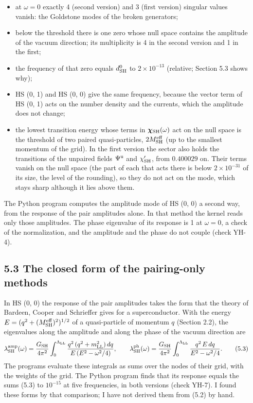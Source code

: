 \documentclass[
  10pt,
]{article}
\providecommand{\tightlist}{%
  \setlength{\itemsep}{0pt}\setlength{\parskip}{0pt}}
\begin{document}
\begin{itemize}
\tightlist
\item
  at \(\omega=0\) exactly 4 (second version) and 3 (first version)
  singular values vanish: the Goldstone modes of the broken generators;
\item
  below the threshold there is one zero whose null space contains the
  amplitude of the vacuum direction; its multiplicity is 4 in the second
  version and 1 in the first;
\item
  the frequency of that zero equals \(d^0_{\rm SH}\) to
  \(2\times10^{-13}\) (relative; Section 5.3 shows why);
\item
  HS (0, 1) and HS (0, 0) give the same frequency, because the vector
  term of HS (0, 1) acts on the number density and the currents, which
  the amplitude does not change;
\item
  the lowest transition energy whose terms in
  \(\boldsymbol\chi_{\rm SH}(\omega)\) act on the null space is the
  threshold of two paired quasi-particles, \(2M^{\rm eff}_{\rm SH}\) (up
  to the smallest momentum of the grid). In the first version the sector
  also holds the transitions of the unpaired fields \(\Psi^{\rm u}\) and
  \(\chi'_{\rm SH}\), from \(0.400029\) on. Their terms vanish on the
  null space (the part of each that acts there is below
  \(2\times10^{-31}\) of its size, the level of the rounding), so they
  do not act on the mode, which stays sharp although it lies above them.
\end{itemize}

The Python program computes the amplitude mode of HS (0, 0) a second
way, from the response of the pair amplitudes alone. In that method the
kernel reads only those amplitudes. The phase eigenvalue of its response
is 1 at \(\omega=0\), a check of the normalization, and the amplitude
and the phase do not couple (check YH-4).

\hypertarget{the-closed-form-of-the-pairing-only-methods-1}{%
\subsection{5.3 The closed form of the pairing-only
methods}\label{the-closed-form-of-the-pairing-only-methods-1}}

In HS (0, 0) the response of the pair amplitudes takes the form that the
theory of Bardeen, Cooper and Schrieffer gives for a superconductor.
With the energy \(E=(q^2+(M^{\rm eff}_{\rm SH})^2)^{1/2}\) of a
quasi-particle of momentum \(q\) (Section 2.2), the eigenvalues along
the amplitude and along the phase of the vacuum direction are
\[\lambda^{\rm amp}_{\rm SH}(\omega)=\frac{G_{\rm SH}}{4\pi^2}\int_0^{\Lambda_{\rm LL}}\frac{q^2\,(q^2+m_{\rm LL}^2)\,dq}{E\,(E^2-\omega^2/4)},\qquad
\lambda^{\rm ph}_{\rm SH}(\omega)=\frac{G_{\rm SH}}{4\pi^2}\int_0^{\Lambda_{\rm LL}}\frac{q^2\,E\,dq}{E^2-\omega^2/4}.\tag{5.3}\]
The programs evaluate these integrals as sums over the nodes of their
grid, with the weights of the grid. The Python program finds that its
response equals the sums (5.3) to \(10^{-15}\) at five frequencies, in
both versions (check YH-7). I found these forms by that comparison; I
have not derived them from (5.2) by hand.
\end{document}
